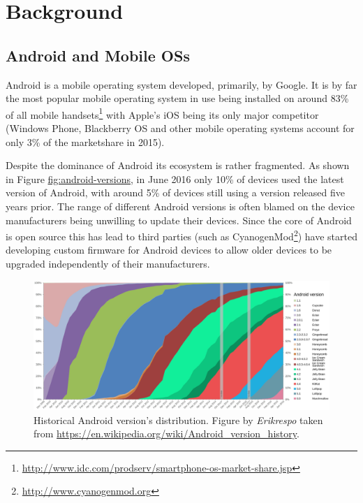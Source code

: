 \documentclass[thesis.tex]{subfiles}
\begin{document}
\chapter{Background}


\section{Android and Mobile OSs}\label{android}

Android is a mobile operating system developed, primarily, by Google. It
is by far the most popular mobile operating system in use being
installed on around 83\% of all mobile handsets\footnote{\url{http://www.idc.com/prodserv/smartphone-os-market-share.jsp}}
with Apple's iOS being its only major competitor (Windows Phone,
Blackberry OS and other mobile operating systems account for only 3\% of
the marketshare in 2015).

Despite the dominance of Android its ecosystem is rather fragmented. As
shown in Figure \url{fig:android-versions}, in June 2016 only 10\% of
devices used the latest version of Android, with around 5\% of devices
still using a version released five years prior. The range of different
Android versions is often blamed on the device manufacturers being
unwilling to update their devices. Since the core of Android is open
source this has lead to third parties (such as CyanogenMod\footnote{\url{http://www.cyanogenmod.org}})
have started developing custom firmware for Android devices to allow
older devices to be upgraded independently of their manufacturers.

\begin{figure}[htbp]
\centering
\includegraphics[width=\linewidth]{figures/android-versions.pdf}
\caption[Historical Android version's distribution.]{Historical Android version's distribution. Figure by \emph{Erikrespo} taken from \url{https://en.wikipedia.org/wiki/Android_version_history}.}
\end{figure}
\end{document}
